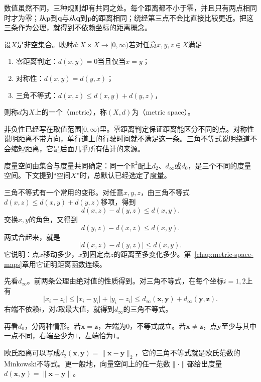 数值虽然不同，三种规则却有共同之处。每个距离都不小于零，并且只有两点相同时才为零；从$\bm p$到$\bm q$与从$\bm q$到$\bm p$的距离相同；绕经第三点不会比直接比较更近。把这三条作为公理，就得到不依赖坐标的距离概念。

\begin{definition}[度量]
\label{def:metric-metric}
设$X$是非空集合。映射$d:X\times X\to[0,\infty)$若对任意$x,y,z\in X$满足
\begin{enumerate}
\item 零距离判定：$d(x,y)=0$当且仅当$x=y$；
\item 对称性：$d(x,y)=d(y,x)$；
\item 三角不等式：$d(x,z)\leq d(x,y)+d(y,z)$，
\end{enumerate}
则称$d$为$X$上的一个（metric），称$(X,d)$为（metric space）。
\end{definition}

非负性已经写在取值范围$[0,\infty)$里。零距离判定保证距离能区分不同的点。对称性说明距离不带方向，单行道上的行驶时间就不满足这一条。三角不等式说明绕道不会缩短距离，它是后面几乎所有估计的来源。

度量空间由集合与度量共同确定：同一个$\mathbb R^2$配上$d_2$、$d_\infty$或$d_0$，是三个不同的度量空间。下文提到“空间$X$”时，总默认已经选定了度量。

三角不等式有一个常用的变形。对任意$x,y,z$，由三角不等式$d(x,z)\leq d(x,y)+d(y,z)$移项，得到
\[
d(x,z)-d(y,z)\leq d(x,y).
\]
交换$x,y$的角色，又得到
\[
d(y,z)-d(x,z)\leq d(x,y).
\]
两式合起来，就是
\begin{equation}
\lvert d(x,z)-d(y,z)\rvert\leq d(x,y).
\label{eq:metric-reverse-triangle}
\end{equation}
它说明：点$x$移动多少，$x$到固定点$z$的距离至多变化多少。第~\ref{chap:metric-space-maps}章用它证明距离函数连续。

\begin{example}[三种平面距离的核对]
\label{ex:metric-three-metrics}
先看$d_\infty$。前两条公理由绝对值的性质得到。对三角不等式，在每个坐标$i=1,2$上有
\[
\lvert x_i-z_i\rvert\leq\lvert x_i-y_i\rvert+\lvert y_i-z_i\rvert\leq d_\infty(\bm x,\bm y)+d_\infty(\bm y,\bm z).
\]
右端不依赖$i$，对$i$取最大值，就得到$d_\infty$的三角不等式。

再看$d_0$，分两种情形。若$\bm x=\bm z$，左端为$0$，不等式成立。若$\bm x\neq\bm z$，点$\bm y$至少与其中一点不同，右端至少为$1$，左端恰为$1$。

欧氏距离可以写成$d_2(\bm x,\bm y)=\lVert\bm x-\bm y\rVert_2$，它的三角不等式就是欧氏范数的Minkowski不等式。更一般地，向量空间上的任一范数$\lVert\cdot\rVert$都给出度量$d(\bm x,\bm y)=\lVert\bm x-\bm y\rVert$。
\end{example}

